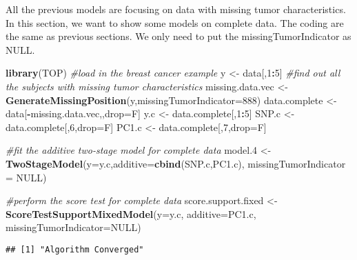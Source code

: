 \documentclass[11pt,]{article}
\newenvironment{Shaded}{\begin{snugshade}}{\end{snugshade}}
\newcommand{\CommentTok}[1]{\textcolor[rgb]{0.56,0.35,0.01}{\textit{#1}}}
\newcommand{\DataTypeTok}[1]{\textcolor[rgb]{0.13,0.29,0.53}{#1}}
\newcommand{\DecValTok}[1]{\textcolor[rgb]{0.00,0.00,0.81}{#1}}
\newcommand{\FloatTok}[1]{\textcolor[rgb]{0.00,0.00,0.81}{#1}}
\newcommand{\KeywordTok}[1]{\textcolor[rgb]{0.13,0.29,0.53}{\textbf{#1}}}
\newcommand{\NormalTok}[1]{#1}
\newcommand{\OperatorTok}[1]{\textcolor[rgb]{0.81,0.36,0.00}{\textbf{#1}}}
\newcommand{\OtherTok}[1]{\textcolor[rgb]{0.56,0.35,0.01}{#1}}
\newcommand{\StringTok}[1]{\textcolor[rgb]{0.31,0.60,0.02}{#1}}
\begin{document}
All the previous models are focusing on data with missing tumor
characteristics. In this section, we want to show some models on
complete data. The coding are the same as previous sections. We only
need to put the missingTumorIndicator as NULL.

\begin{Shaded}
\begin{Highlighting}[]
\KeywordTok{library}\NormalTok{(TOP)}
\CommentTok{#load in the breast cancer example}
\NormalTok{y <-}\StringTok{ }\NormalTok{data[,}\DecValTok{1}\OperatorTok{:}\DecValTok{5}\NormalTok{]}
\CommentTok{#find out all the subjects with missing tumor characteristics}
\NormalTok{missing.data.vec <-}\StringTok{ }\KeywordTok{GenerateMissingPosition}\NormalTok{(y,}\DataTypeTok{missingTumorIndicator=}\DecValTok{888}\NormalTok{)}
\NormalTok{data.complete <-}\StringTok{ }\NormalTok{data[}\OperatorTok{-}\NormalTok{missing.data.vec,,drop=F]}
\NormalTok{y.c <-}\StringTok{ }\NormalTok{data.complete[,}\DecValTok{1}\OperatorTok{:}\DecValTok{5}\NormalTok{]}
\NormalTok{SNP.c <-}\StringTok{ }\NormalTok{data.complete[,}\DecValTok{6}\NormalTok{,drop=F]}
\NormalTok{PC1.c <-}\StringTok{ }\NormalTok{data.complete[,}\DecValTok{7}\NormalTok{,drop=F]}

\CommentTok{#fit the additive two-stage model for complete data}
\NormalTok{model}\FloatTok{.4}\NormalTok{ <-}\StringTok{ }\KeywordTok{TwoStageModel}\NormalTok{(}\DataTypeTok{y=}\NormalTok{y.c,}\DataTypeTok{additive=}\KeywordTok{cbind}\NormalTok{(SNP.c,PC1.c),}
                         \DataTypeTok{missingTumorIndicator =} \OtherTok{NULL}\NormalTok{)}


\CommentTok{#perform the score test for complete data}
\NormalTok{score.support.fixed <-}\StringTok{ }\KeywordTok{ScoreTestSupportMixedModel}\NormalTok{(}\DataTypeTok{y=}\NormalTok{y.c,}
                                                  \DataTypeTok{additive=}\NormalTok{PC1.c,}
                                                  \DataTypeTok{missingTumorIndicator=}\OtherTok{NULL}\NormalTok{)}
\end{Highlighting}
\end{Shaded}

\begin{verbatim}
## [1] "Algorithm Converged"
\end{verbatim}
\end{document}
